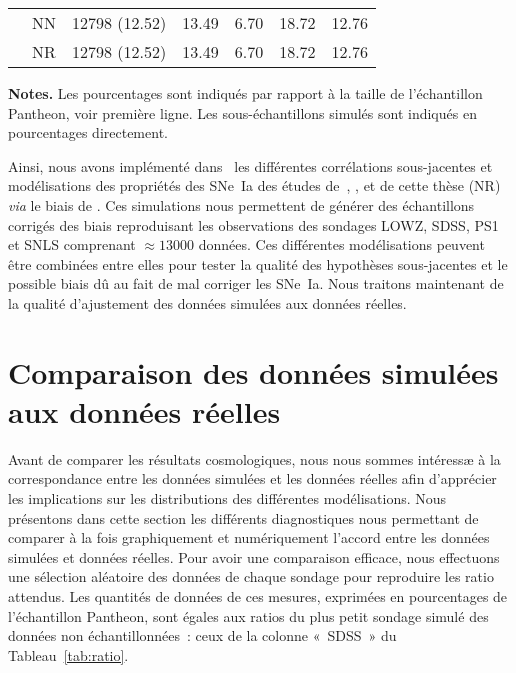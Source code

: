 \documentclass[../main/main.tex]{subfiles}
\begin{document}
\begin{table}[ht]
\begin{threeparttable}
\begin{tabular}{ccccccc}
            & NN & 12798 (12.52) & 13.49 & 6.70 & 18.72 & 12.76 \\
            & NR & 12798 (12.52) & 13.49 & 6.70 & 18.72 & 12.76 \\
            \bottomrule
        \end{tabular}
        \begin{tablenotes}[flushleft]
            \item \small \textbf{\hspace{-3,2pt}Notes.} Les pourcentages
                sont indiqués par rapport à la taille de l'échantillon
                Pantheon, voir première ligne. Les sous-échantillons simulés
                sont indiqués en pourcentages directement.
        \end{tablenotes}
    \end{threeparttable}
\end{table}


Ainsi, nous avons implémenté dans \snana\ les différentes corrélations
sous-jacentes et modélisations des propriétés des SNe~Ia des études
de~, , 
et de cette thèse (NR) \textit{via} le biais de \hostlib. Ces simulations nous
permettent de générer des échantillons corrigés des biais reproduisant les
observations des sondages LOWZ, SDSS, PS1 et SNLS comprenant $\approx
\num{13000}$ données. Ces différentes modélisations peuvent être combinées entre
elles pour tester la qualité des hypothèses sous-jacentes et le possible biais
dû au fait de mal corriger les SNe~Ia. Nous traitons maintenant de la qualité
d'ajustement des données simulées aux données réelles.

\section{Comparaison des données simulées aux données réelles}\label{sec:comp}

Avant de comparer les résultats cosmologiques, nous nous sommes intéressæ à la
correspondance entre les données simulées et les données réelles afin
d'apprécier les implications sur les distributions des différentes
modélisations. Nous présentons dans cette section les différents diagnostiques
nous permettant de comparer à la fois graphiquement et numériquement l'accord
entre les données simulées et données réelles. Pour avoir une comparaison
efficace, nous effectuons une sélection aléatoire des données de chaque sondage
pour reproduire les ratio attendus. Les quantités de données de ces mesures,
exprimées en pourcentages de l'échantillon Pantheon, sont égales aux ratios du
plus petit sondage simulé des données non échantillonnées~: ceux de la colonne
«~SDSS~» du Tableau~\ref{tab:ratio}.
\end{document}
